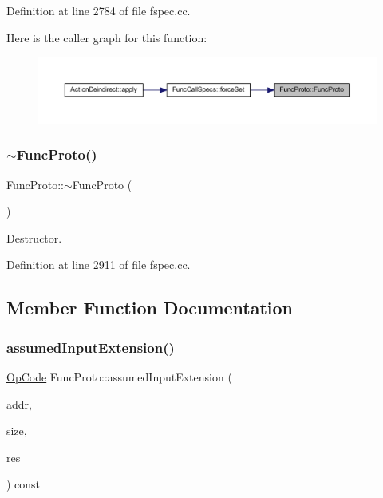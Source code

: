 Definition at line 2784 of file fspec.\+cc.

Here is the caller graph for this function\+:
\nopagebreak
\begin{figure}[H]
\begin{center}
\leavevmode
\includegraphics[width=350pt]{class_func_proto_a9c7db7dec63a18a9de97b0ba9f6f42bd_icgraph}
\end{center}
\end{figure}
\mbox{\label{class_func_proto_a142706f5f3c9086635f812501521f3b4}} 
\subsubsection{\texorpdfstring{$\sim$FuncProto()}{~FuncProto()}}
{\footnotesize\ttfamily Func\+Proto\+::$\sim$\+Func\+Proto (\begin{DoxyParamCaption}\item[{void}]{ }\end{DoxyParamCaption})}



Destructor. 



Definition at line 2911 of file fspec.\+cc.



\subsection{Member Function Documentation}
\mbox{\label{class_func_proto_ace1a73b8df1756f6945df97319270508}} 
\subsubsection{\texorpdfstring{assumedInputExtension()}{assumedInputExtension()}}
{\footnotesize\ttfamily \mbox{\hyperlink{opcodes_8hh_abeb7dfb0e9e2b3114e240a405d046ea7}{Op\+Code}} Func\+Proto\+::assumed\+Input\+Extension (\begin{DoxyParamCaption}\item[{const \mbox{\hyperlink{class_address}{Address}} \&}]{addr,  }\item[{int4}]{size,  }\item[{\mbox{\hyperlink{struct_varnode_data}{Varnode\+Data}} \&}]{res }\end{DoxyParamCaption}) const\hspace{0.3cm}{\ttfamily [inline]}}



